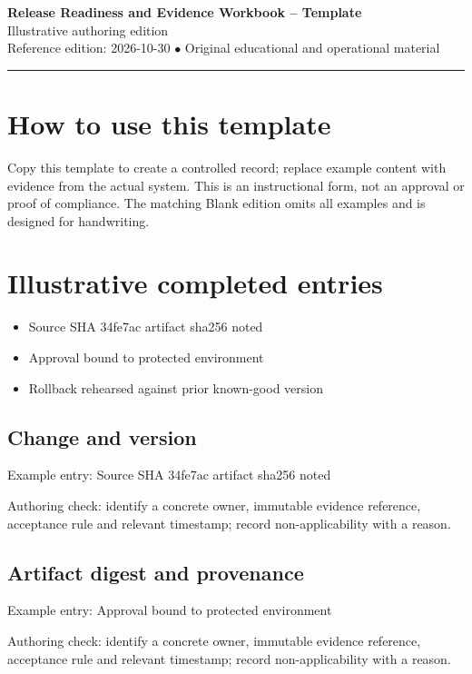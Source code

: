 \documentclass[10pt,letterpaper]{article}
\begin{document}
\begin{center}
{\LARGE\bfseries\color{cdblue}Release Readiness and Evidence Workbook -- Template}\\[7pt]
{\large Illustrative authoring edition}\\[6pt]
{\small Reference edition: 2026-10-30 $\bullet$ Original educational and operational material}
\end{center}
\noindent\color{cdblue}\rule{\linewidth}{1.2pt}\color{black}
\vspace{0.4em}
\section{How to use this template}
Copy this template to create a controlled record; replace example content with evidence from the actual system. This is an instructional form, not an approval or proof of compliance. The matching Blank edition omits all examples and is designed for handwriting.


\section{Illustrative completed entries}
\begin{itemize}
\item Source SHA 34fe7ac artifact sha256 noted
\item Approval bound to protected environment
\item Rollback rehearsed against prior known-good version
\end{itemize}

\subsection{Change and version}
Example entry: Source SHA 34fe7ac artifact sha256 noted

Authoring check: identify a concrete owner, immutable evidence reference, acceptance rule and relevant timestamp; record non-applicability with a reason.


\subsection{Artifact digest and provenance}
Example entry: Approval bound to protected environment

Authoring check: identify a concrete owner, immutable evidence reference, acceptance rule and relevant timestamp; record non-applicability with a reason.
\end{document}
